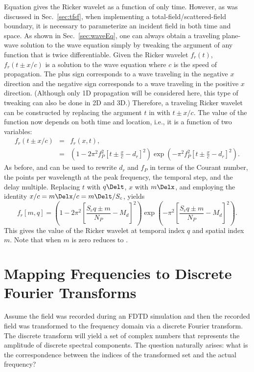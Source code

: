 Equation  gives the Ricker wavelet as a function
of only time.  However, as was discussed in Sec.\ \ref{sec:tfsf}, when
implementing a total-field/scattered-field boundary, it is necessary
to parameterize an incident field in both time and space.  As shown in
Sec.\ \ref{sec:waveEq}, one can always obtain a traveling plane-wave
solution to the wave equation simply by tweaking the argument of any
function that is twice differentiable.  Given the Ricker wavelet
$f_r(t)$, $f_r(t\pm x/c)$ is a solution to the wave equation where $c$
is the speed of propagation.  The plus sign corresponds to a wave
traveling in the negative $x$ direction and the negative sign
corresponds to a wave traveling in the positive $x$ direction.
(Although only 1D propagation will be considered here, this type
of tweaking can also be done in 2D and 3D.)  Therefore, a traveling
Ricker wavelet can be constructed by replacing the argument $t$ in
 with $t\pm x/c$.  The value of the function now
depends on both time and location, i.e., it is a function of two
variables:
\begin{eqnarray}
f_r(t\pm x/c) & = & f_r(x,t), \nonumber \\
& = & \left(1-2 \pi^2 f_P^2 \left[t\pm\frac{x}{c}-d_r\right]^2\right)
       \exp\left(-\pi^2 f_P^2 \left[t\pm\frac{x}{c}-d_r\right]^2\right).
\end{eqnarray}
As before,  and  can be used to
rewrite $d_r$ and $f_P$ in terms of the Courant number, the points per
wavelength at the peak frequency, the temporal step, and the delay
multiple.  Replacing $t$ with $q\Delt$, $x$ with $m\Delx$, and
employing the identity $x/c = m\Delx/c = m\Delt/S_c$, yields
\begin{equation}
  f_r[m,q] =
  \left(1 - 2 \pi^2 \left[\frac{S_c q\pm m}{N_P} - M_d\right]^2\right)
  \exp\left(-\pi^2 \left[\frac{S_c q\pm m}{N_P} - M_d\right]^2\right).
  \label{eq:rickerDiscretex} 
\end{equation}
This gives the value of the Ricker wavelet at temporal index $q$ and
spatial index $m$.  Note that when $m$ is zero 
reduces to .


\section{Mapping Frequencies to Discrete Fourier Transforms
\label{sec:fftMapping}}

Assume the field was recorded during an FDTD simulation and then the
recorded field was transformed to the frequency domain via a discrete
Fourier transform.  The discrete transform will yield a set of complex
numbers that represents the amplitude of discrete spectral components.
The question naturally arises: what is the correspondence between the
indices of the transformed set and the actual frequency?

